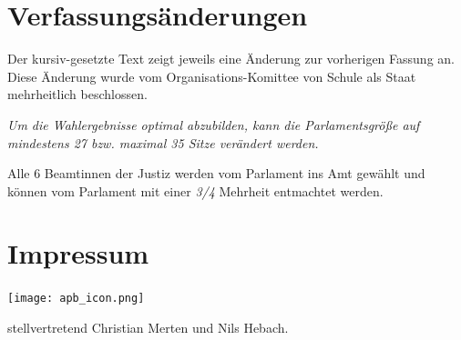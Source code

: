 \documentclass{sasbase}
\begin{document}

\section{Verfassungsänderungen}
Der kursiv-gesetzte Text zeigt jeweils eine Änderung zur vorherigen Fassung an. Diese Änderung wurde vom Organisations-Komittee von Schule als Staat mehrheitlich beschlossen.
    \setcounter{articleno}{18}
    \begin{article}[Wahlrecht]
        \setcounter{enumi}{5}
    \item \textit{Um die Wahlergebnisse optimal abzubilden, kann die Parlamentsgröße auf mindestens 27 bzw. maximal 35 Sitze verändert werden.}
    \end{article}
    \setcounter{articleno}{31}
    \begin{article}
    \item Alle 6 Beamtinnen der Justiz werden vom Parlament ins Amt gewählt und können vom Parlament mit einer \textit{3/4} Mehrheit entmachtet werden.
    \end{article}
\section{Impressum}
\begin{minipage}{0.4\linewidth}
\texttt{[image: apb\_icon.png]}
\end{minipage}
\begin{minipage}{0.5\linewidth}
{\raggedright stellvertretend Christian Merten und Nils Hebach.}
\end{minipage}
\end{document}

